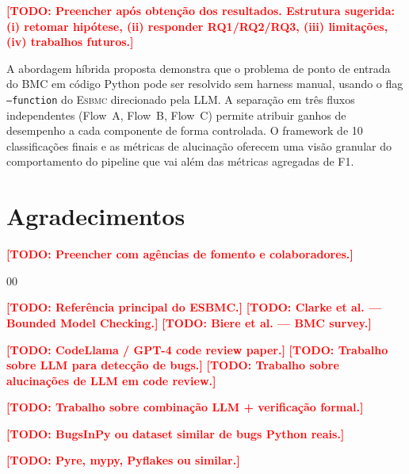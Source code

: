 \documentclass[conference]{IEEEtran}
\newcommand{\esbmc}{\textsc{Esbmc}}
\newcommand{\flowA}{Flow~A}
\newcommand{\flowB}{Flow~B}
\newcommand{\flowC}{Flow~C}
\newcommand{\todo}[1]{\textcolor{red}{\textbf{[TODO: #1]}}}
\begin{document}
\todo{Preencher após obtenção dos resultados. Estrutura sugerida:
      (i) retomar hipótese, (ii) responder RQ1/RQ2/RQ3,
      (iii) limitações, (iv) trabalhos futuros.}

A abordagem híbrida proposta demonstra que o problema de ponto de entrada
do BMC em código Python pode ser resolvido sem harness manual, usando
o flag \texttt{--function} do \esbmc{} direcionado pela LLM.
A separação em três fluxos independentes (\flowA{}, \flowB{}, \flowC{})
permite atribuir ganhos de desempenho a cada componente de forma
controlada.
O framework de 10 classificações finais e as métricas de alucinação
oferecem uma visão granular do comportamento do pipeline que vai além
das métricas agregadas de F1.

\section*{Agradecimentos}

\todo{Preencher com agências de fomento e colaboradores.}

\begin{thebibliography}{00}

  \todo{Referência principal do ESBMC.}
  \todo{Clarke et al. — Bounded Model Checking.}
  \todo{Biere et al. — BMC survey.}

  \todo{CodeLlama / GPT-4 code review paper.}
  \todo{Trabalho sobre LLM para detecção de bugs.}
  \todo{Trabalho sobre alucinações de LLM em code review.}

  \todo{Trabalho sobre combinação LLM + verificação formal.}

  \todo{BugsInPy ou dataset similar de bugs Python reais.}

  \todo{Pyre, mypy, Pyflakes ou similar.}

\end{thebibliography}
\end{document}
